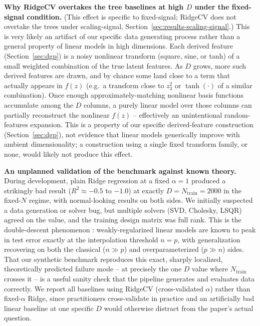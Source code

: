 \documentclass{article}
\begin{document}
\textbf{Why RidgeCV overtakes the tree baselines at high $D$ under the fixed-signal
condition.} (This effect is specific to fixed-signal; RidgeCV does not overtake the
trees under scaling-signal, Section~\ref{sec:results-scaling-signal}.) This is very likely an
artifact of our specific data generating process rather than a general property of
linear models in high dimensions. Each derived feature (Section~\ref{sec:dgp}) is a
noisy nonlinear transform (square, sine, or tanh) of a small weighted combination of
the true latent features. As $D$ grows, more such derived features are drawn, and by
chance some land close to a term that actually appears in $f(z)$ (e.g.\ a transform
close to $z_3^2$ or $\tanh(\cdot)$ of a similar combination). Once enough
approximately-matching nonlinear basis functions accumulate among the $D$ columns, a
purely linear model over those columns can partially reconstruct the nonlinear $f(z)$
-- effectively an unintentional random-features expansion. This is a property of our
specific derived-feature construction (Section~\ref{sec:dgp}), not evidence that
linear models generically improve with ambient dimensionality; a construction using a
single fixed transform family, or none, would likely not produce this effect.

\textbf{An unplanned validation of the benchmark against known theory.} During
development, plain Ridge regression at a fixed $\alpha=1$ produced a strikingly bad
result ($R^2 \approx -0.5$ to $-1.0$) at exactly $D = N_{\text{train}} = 2000$ in the
fixed-$N$ regime, with normal-looking results on both sides. We initially suspected a
data generation or solver bug, but multiple solvers (SVD, Cholesky, LSQR) agreed on
the value, and the training design matrix was full rank. This is the double-descent
phenomenon \citep{belkin2019reconciling}: weakly-regularized linear models are known
to peak in test error exactly at the interpolation threshold $n=p$, with
generalization recovering on both the classical ($n \gg p$) and overparameterized
($p \gg n$) sides. That our synthetic benchmark reproduces this exact, sharply
localized, theoretically predicted failure mode -- at precisely the one $D$ value
where $N_{\text{train}}$ crosses it -- is a useful sanity check that the pipeline
generates and evaluates data correctly. We report all baselines using RidgeCV
(cross-validated $\alpha$) rather than fixed-$\alpha$ Ridge, since practitioners
cross-validate in practice and an artificially bad linear baseline at one specific
$D$ would otherwise distract from the paper's actual question.
\end{document}
